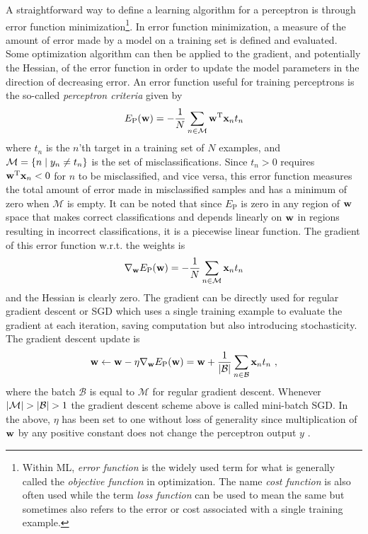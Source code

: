 A straightforward way to define a learning algorithm for a perceptron is through error function minimization\footnote{Within \gls{ML}, \textit{error function} is the widely used term for what is generally called the \textit{objective function} in optimization. The name \textit{cost function} is also often used while the term \textit{loss function} can be used to mean the same but sometimes also refers to the error or cost associated with a single training example.}. In error function minimization, a measure of the amount of error made by a model on a training set is defined and evaluated. Some optimization algorithm can then be applied to the gradient, and potentially the Hessian, of the error function in order to update the model parameters in the direction of decreasing error. 
An error function useful for training perceptrons is the so-called \textit{perceptron criteria} given by
\begin{equation}
    E_\text{P}({\mathbf{w}}) = -\frac{1}{N}\sum_{n\in\mathcal{M}}{\mathbf{w}}{^\mathrm{T}}{\mathbf{x}}_n t_n
\end{equation}
where $t_n$ is the $n$'th target in a training set of $N$ examples, and $\mathcal{M}={\left\{n \mid y_n\ne t_n\right\}}$ is the set of misclassifications. Since $t_n>0$ requires ${\mathbf{w}}{^\mathrm{T}}{\mathbf{x}}_n<0$ for $n$ to be misclassified, and vice versa, this error function measures the total amount of error made in misclassified samples and has a minimum of zero when $\mathcal{M}$ is empty. 
It can be noted that since $E_\text{P}$ is zero in any region of ${\mathbf{w}}$ space that makes correct classifications and depends linearly on ${\mathbf{w}}$ in regions resulting in incorrect classifications, it is a piecewise linear function.
The gradient of this error function w.r.t. the weights is
\begin{equation}
    \nabla_{\mathbf{w}} E_\text{P}({\mathbf{w}}) = -\frac{1}{N}\sum_{n\in\mathcal{M}}{\mathbf{x}}_n t_n
\end{equation}
and the Hessian is clearly zero. The gradient can be directly used for regular gradient descent or \gls{SGD} which uses a single training example to evaluate the gradient at each iteration, saving computation but also introducing stochasticity. The gradient descent update is
\begin{equation}
    \w \leftarrow \w -\eta\nabla_\w E_\text{P}(\w) = \w+\frac{1}{\size{\mathcal{B}}}\sum_{n\in\mathcal{B}}\x_n t_n \ ,
\end{equation}
where the batch $\mathcal{B}$ is equal to $\mathcal{M}$ for regular gradient descent. Whenever ${\left\lvert\mathcal{M}\right\rvert}>{\left\lvert\mathcal{B}\right\rvert}>1$ the gradient descent scheme above is called mini-batch \gls{SGD}. In the above, $\eta$ has been set to one without loss of generality since multiplication of ${\mathbf{w}}$ by any positive constant does not change the perceptron output $y$ \cite{Bishop2006}.



